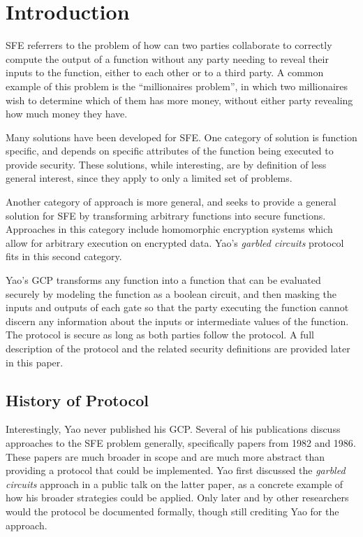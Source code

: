 \section{Introduction}
\label{sec:intro}

\ac{SFE} referrers to the problem of how can two parties collaborate to correctly compute the output of a function without any party needing to reveal their inputs to the function, either to each other or to a third party.  A common example of this problem is the ``millionaires problem'', in which two millionaires wish to determine which of them has more money, without either party revealing how much money they have\cite{yao1982protocols}.

Many solutions have been developed for \ac{SFE}. One category of solution is function specific, and depends on specific attributes of the function being executed to provide security\cite{huang2011faster}.  These solutions, while interesting, are by definition of less general interest, since they apply to only a limited set of problems.

Another category of approach is more general, and seeks to provide a general solution for \ac{SFE} by transforming arbitrary functions into secure functions. Approaches in this category include homomorphic encryption systems\cite{gentry2009fully} which allow for arbitrary execution on encrypted data.  Yao's \emph{garbled circuits} protocol fits in this second category.

Yao's \ac{GCP} transforms any function into a function that can be evaluated securely by modeling the function as a boolean circuit, and then masking the inputs and outputs of each gate so that the party executing the function cannot discern any information about the inputs or intermediate values of the function. The protocol is secure as long as both parties follow the protocol. A full description of the protocol and the related security definitions are provided later in this paper.

\subsection{History of Protocol}

Interestingly, Yao never published his \ac{GCP}. Several of his publications discuss approaches to the \ac{SFE} problem generally, specifically papers from 1982\cite{yao1982protocols} and 1986\cite{yao1986generate}. These papers are much broader in scope and are much more abstract than providing a protocol that could be implemented. Yao first discussed the \emph{garbled circuits} approach in a public talk on the latter paper, as a concrete example of how his broader strategies could be applied\cite{bellare2012foundations}. Only later and by other researchers would the protocol be documented formally\cite{goldreich1987play}, though still crediting Yao for the approach.

